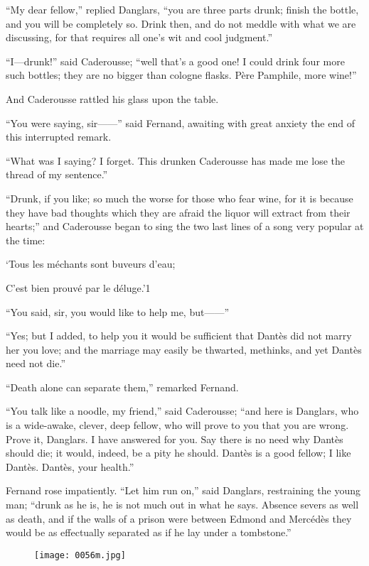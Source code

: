 “My dear fellow,” replied Danglars, “you are three parts drunk; finish
the bottle, and you will be completely so. Drink then, and do not
meddle with what we are discussing, for that requires all one’s wit and
cool judgment.”

“I—drunk!” said Caderousse; “well that’s a good one! I could drink four
more such bottles; they are no bigger than cologne flasks. Père
Pamphile, more wine!”

And Caderousse rattled his glass upon the table.

“You were saying, sir——” said Fernand, awaiting with great anxiety the
end of this interrupted remark.

“What was I saying? I forget. This drunken Caderousse has made me lose
the thread of my sentence.”

“Drunk, if you like; so much the worse for those who fear wine, for it
is because they have bad thoughts which they are afraid the liquor will
extract from their hearts;” and Caderousse began to sing the two last
lines of a song very popular at the time:

‘Tous les méchants sont buveurs d’eau;

C’est bien prouvé par le déluge.’1


“You said, sir, you would like to help me, but——”

“Yes; but I added, to help you it would be sufficient that Dantès did
not marry her you love; and the marriage may easily be thwarted,
methinks, and yet Dantès need not die.”

“Death alone can separate them,” remarked Fernand.

“You talk like a noodle, my friend,” said Caderousse; “and here is
Danglars, who is a wide-awake, clever, deep fellow, who will prove to
you that you are wrong. Prove it, Danglars. I have answered for you.
Say there is no need why Dantès should die; it would, indeed, be a pity
he should. Dantès is a good fellow; I like Dantès. Dantès, your
health.”

Fernand rose impatiently. “Let him run on,” said Danglars, restraining
the young man; “drunk as he is, he is not much out in what he says.
Absence severs as well as death, and if the walls of a prison were
between Edmond and Mercédès they would be as effectually separated as
if he lay under a tombstone.”

\begin{figure}[ht]
\texttt{[image: 0056m.jpg]}
\end{figure}

